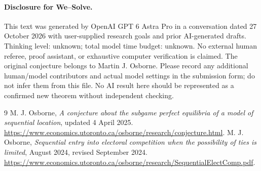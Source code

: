 \documentclass[10pt]{article}
\begin{document}
\paragraph{Disclosure for We--Solve.}
This text was generated by OpenAI GPT 6 Astra Pro in a conversation dated 27 October 2026 with user-supplied research goals and prior AI-generated drafts. Thinking level: unknown; total model time budget: unknown. No external human referee, proof assistant, or exhaustive computer verification is claimed. The original conjecture belongs to Martin J. Osborne. Please record any additional human/model contributors and actual model settings in the submission form; do not infer them from this file. No AI result here should be represented as a confirmed new theorem without independent checking.

\begin{thebibliography}{9}
 M. J. Osborne, \emph{A conjecture about the subgame perfect equilibria of a model of sequential location}, updated 4 April 2025. \url{https://www.economics.utoronto.ca/osborne/research/conjecture.html}.
 M. J. Osborne, \emph{Sequential entry into electoral competition when the possibility of ties is limited}, August 2024, revised September 2024. \url{https://www.economics.utoronto.ca/osborne/research/SequentialElectComp.pdf}.
\end{thebibliography}
\end{document}
